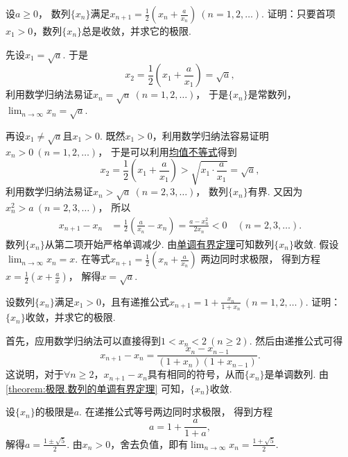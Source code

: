 \begin{example}
设\(a\geq0\)，
数列\(\{x_n\}\)满足\(x_{n+1} = \frac12\left(x_n+\frac{a}{x_n}\right)\ (n=1,2,\dotsc)\).
证明：只要首项\(x_1>0\)，数列\(\{x_n\}\)总是收敛，并求它的极限.
\begin{solution}
先设\(x_1=\sqrt{a}\).
于是\[
	x_2 = \frac12 \left(x_1+\frac{a}{x_1}\right)
	= \sqrt{a},
\]
利用数学归纳法易证\(x_n = \sqrt{a}\ (n=1,2,\dotsc)\)，
于是\(\{x_n\}\)是常数列，
\(\lim_{n\to\infty} x_n = \sqrt{a}\).

再设\(x_1\neq\sqrt{a}\)且\(x_1>0\).
既然\(x_1>0\)，利用数学归纳法容易证明\(x_n>0\ (n=1,2,\dotsc)\)，
于是可以利用\hyperref[theorem:不等式.基本不等式2推论1]{均值不等式}得到\[
	x_2
	= \frac12\left(x_1+\frac{a}{x_1}\right)
	> \sqrt{x_1 \cdot \frac{a}{x_1}}
	= \sqrt{a},
\]
利用数学归纳法易证\(x_n > \sqrt{a}\ (n=2,3,\dotsc)\)，
数列\(\{x_n\}\)有界.
又因为\(x_n^2 > a\ (n=2,3,\dotsc)\)，
所以\begin{align*}
	x_{n+1}-x_n
	&= \frac12 \left(\frac{a}{x_n}-x_n\right)
	= \frac{a-x_n^2}{2x_n}
	< 0
	\quad(n=2,3,\dotsc).
\end{align*}
数列\(\{x_n\}\)从第二项开始严格单调减少.
由\hyperref[theorem:极限.数列的单调有界定理]{单调有界定理}可知数列\(\{x_n\}\)收敛.
假设\(\lim_{n\to\infty} x_n = x\).
在等式\(x_{n+1} = \frac12\left(x_n+\frac{a}{x_n}\right)\)
两边同时求极限，
得到方程\(x = \frac12\left(x+\frac{a}{x}\right)\)，
解得\(x = \sqrt{a}\).
\end{solution}
\end{example}

\begin{example}
设数列\(\{x_n\}\)满足\(x_1>0\)，且有递推公式\(x_{n+1}=1+\frac{x_n}{1+x_n}\ (n=1,2,\dotsc)\).
证明：\(\{x_n\}\)收敛，并求它的极限.
\begin{solution}
首先，应用数学归纳法可以直接得到\(1<x_n<2\ (n\geq2)\).
然后由递推公式可得\[
	x_{n+1}-x_n = \frac{x_n-x_{n-1}}{(1+x_n)(1+x_{n-1})}.
\]
这说明，对于\(\forall n\geq2\)，\(x_{n+1}-x_n\)具有相同的符号，从而\(\{x_n\}\)是单调数列.
由\cref{theorem:极限.数列的单调有界定理} 可知，\(\{x_n\}\)收敛.

设\(\{x_n\}\)的极限是\(a\).
在递推公式等号两边同时求极限，
得到方程\[
	a = 1 + \frac{a}{1+a},
\]
解得\(a = \frac{1\pm\sqrt5}2\).
由\(x_n>0\)，舍去负值，即有\(\lim_{n\to\infty} x_n = \frac{1+\sqrt5}2\).
\end{solution}
\end{example}

